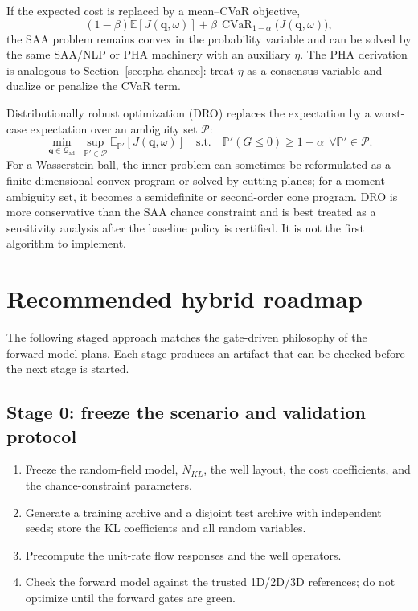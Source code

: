 \documentclass[11pt]{article}
\numberwithin{equation}{section}
\newcommand{\E}{\mathbb{E}}
\newcommand{\Prob}{\mathbb{P}}
\newcommand{\qq}{\mathbf{q}}
\newcommand{\CVaR}{\operatorname{CVaR}}
\theoremstyle{plain}
\begin{document}
If the expected cost is replaced by a mean--CVaR objective,
\begin{equation}
\label{eq:meancvar}
(1-\beta)\E[J(\qq,\omega)]
+\beta\,\CVaR_{1-\alpha}\bigl(J(\qq,\omega)\bigr),
\end{equation}
the SAA problem remains convex in the probability variable and can be solved
by the same SAA/NLP or PHA machinery with an auxiliary $\eta$.  The PHA
derivation is analogous to Section~\ref{sec:pha-chance}: treat $\eta$ as a
consensus variable and dualize or penalize the CVaR term.

Distributionally robust optimization (DRO) replaces the expectation by a
worst-case expectation over an ambiguity set $\mathcal{P}$:
\begin{equation}
\label{eq:dro}
\min_{\qq\in\mathcal{Q}_{\mathrm{ad}}}\
\sup_{\Prob'\in\mathcal{P}}\E_{\Prob'}[J(\qq,\omega)]
\quad\text{s.t.}\quad
\Prob'(G\le0)\ge1-\alpha\ \ \forall\Prob'\in\mathcal{P}.
\end{equation}
For a Wasserstein ball, the inner problem can sometimes be reformulated as a
finite-dimensional convex program or solved by cutting planes; for a
moment-ambiguity set, it becomes a semidefinite or second-order cone program.
DRO is more conservative than the SAA chance constraint and is best treated as
a sensitivity analysis after the baseline policy is certified.  It is not the
first algorithm to implement.

\section{Recommended hybrid roadmap}
\label{sec:hybrid}

The following staged approach matches the gate-driven philosophy of the
forward-model plans.  Each stage produces an artifact that can be checked
before the next stage is started.

\subsection{Stage 0: freeze the scenario and validation protocol}

\begin{enumerate}[leftmargin=1.6em,itemsep=2pt]
  \item Freeze the random-field model, $N_{KL}$, the well layout, the cost
        coefficients, and the chance-constraint parameters.
  \item Generate a training archive and a disjoint test archive with
        independent seeds; store the KL coefficients and all random variables.
  \item Precompute the unit-rate flow responses and the well operators.
  \item Check the forward model against the trusted 1D/2D/3D references; do not
        optimize until the forward gates are green.
\end{enumerate}
\end{document}
